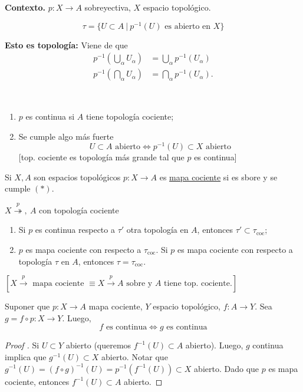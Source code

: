 \noindent \textbf{Contexto.} $p : X \to A$ sobreyectiva, $X$ espacio topológico.

\begin{definition}
	\[ \tau = \{ U \subset A \ \big| \ p^{-1}(U) \text{ es abierto en } X \} \]
\end{definition}

\noindent \textbf{Esto es topología:} Viene de que
\begin{align*}
	p^{-1}\left(\bigcup_{\alpha} U_{\alpha}\right) & = \bigcup_{\alpha} p^{-1}(U_{\alpha}) \\
	p^{-1}\left(\bigcap_{\alpha} U_{\alpha}\right) & = \bigcap_{\alpha} p^{-1}(U_{\alpha})
.\end{align*}

\begin{observe}~
	\begin{enumerate}
		\item $p$ es continua si $A$ tiene topología cociente;

		\item Se cumple algo más fuerte
		\[ U \subset A \text{ abierto} \iff p^{-1}(U) \subset X \text{ abierto} \tag{$*$} \]
		[top. cociente es topología más grande tal que $p$ es continua]
	\end{enumerate}
\end{observe}

\begin{definition}
	Si $X,A$ son espacios topológicos $p:X \to A$ es \underline{mapa cociente} si es sbore y se cumple $(*)$.
\end{definition}

\begin{observe}
	$X \stackrel{p}{\twoheadrightarrow},\ A$ con topología cociente
	\begin{enumerate}
		\item Si $p$ es continua respecto a $\tau'$ otra topología en $A$, entonces $\tau' \subset \tau_{\text{coc}}$;

		\item $p$ es mapa cociente con respecto a $\tau_{\text{coc}}$. Si $p$ es mapa cociente con respecto a topología $\tau$ en $A$, entonces $\tau = \tau_{\text{coc}}$.
	\end{enumerate}
	$ [ X \stackrel{p}{\to} \text{ mapa cociente } \equiv X \stackrel{p}{\to} A \text{ sobre y } A \text{ tiene top. cociente.} ] $
\end{observe}

\begin{property}
	Suponer que $p: X \to A$ mapa cociente, $Y$ espacio topológico, $f: A \to Y$. Sea $g = f \circ p : X \to Y$. Luego,
	\[ f \text{ es continua} \iff g \text{ es continua} \]
\end{property}
\begin{proof}[Proof ]
	\Ifstep Si $U\subset Y$ abierto (queremos $f^{-1}(U) \subset A$ abierto). Luego, $g$ continua implica que $g^{-1}(U)\subset X$ abierto. Notar que $g^{-1}(U) = (f\circ g)^{-1}(U) = p^{-1}(f^{-1}(U)) \subset X$ abierto. Dado que $p$ es mapa cociente, entonces $f^{-1}(U) \subset A$ abierto.
\end{proof}

